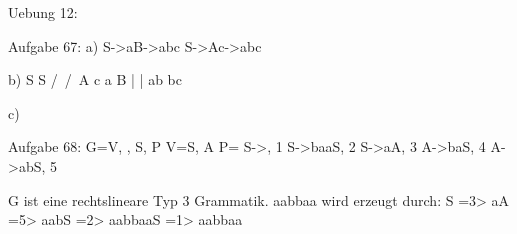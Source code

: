 Uebung 12:

Aufgabe 67:
a)
S->aB->abc
S->Ac->abc

b)
  S		S
  /\	/\
  A c	a B
  |		  |
 ab		  bc
 
c)


Aufgabe 68:
G={V, \sigma, S, P}
V={S, A}
P={
S->\epsilon,	1
S->baaS,		2
S->aA,			3
A->baS,			4
A->abS,			5
}

G ist eine rechtslineare Typ 3 Grammatik.
aabbaa wird erzeugt durch:
S =3> aA =5> aabS =2> aabbaaS =1> aabbaa
